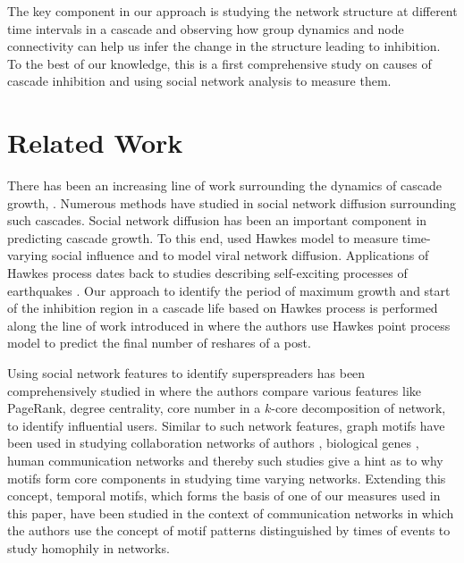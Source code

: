 \documentclass[smallextended]{svjour3}       %
\theoremstyle{definition}
\begin{document}
The key component in our approach is studying the network structure at different time intervals in a cascade and observing how group dynamics and node connectivity can help us infer the change in the structure leading to inhibition. To the best of our knowledge, this is a first comprehensive study on causes of cascade inhibition and using social network analysis to measure them.

\section{Related Work}
There has been an increasing line of work surrounding the dynamics of cascade growth\cite{cui_behavior}, \cite{leskovic_bib}. Numerous methods have studied in social network diffusion \cite{paulo_book} surrounding such cascades. Social network diffusion has been an important component in predicting cascade growth. To this end, \cite{hawkes_zha}\cite{zha_diffusion} used Hawkes model to measure time-varying social influence and to model viral network diffusion. Applications of Hawkes process dates back to studies describing self-exciting processes of earthquakes \cite{hawkes_pp}. Our approach to identify the period of maximum growth and start of the inhibition region in a cascade life based on Hawkes process is performed along the line of work introduced in \cite{seismic} where the authors use Hawkes point process model to predict the final number of reshares of a post. 

Using social network features to identify superspreaders has been comprehensively studied in \cite{sei_spreaders}\cite{kitsak}\cite{paulo} where the authors compare various features like PageRank, degree centrality, core number in a $k$-core decomposition of network, to identify influential users. Similar to such network features, graph motifs have been used in studying collaboration networks of authors \cite{iitkgp}, biological genes \cite{motif_uln}, human communication networks \cite{human_com} and thereby such studies give a hint as to why motifs form core components in studying time varying networks. Extending this concept, temporal motifs, which forms the basis of one of our measures used in this paper, have been studied in the context of communication networks \cite{temporal_com}\cite{temporal_1} in which the authors use the concept of motif patterns distinguished by times of events to study homophily in networks.
\end{document}
